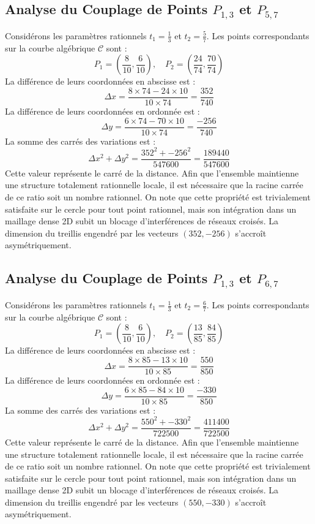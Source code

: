 \documentclass[12pt, a4paper]{article}
\begin{document}
\subsection{Analyse du Couplage de Points $P_{1,3}$ et $P_{5,7}$}
Considérons les paramètres rationnels $t_1 = \frac{1}{3}$ et $t_2 = \frac{5}{7}$.
Les points correspondants sur la courbe algébrique $\mathcal{C}$ sont :
$$ P_1 = \left( \frac{8}{10}, \frac{6}{10} \right), \quad P_2 = \left( \frac{24}{74}, \frac{70}{74} \right) $$
La différence de leurs coordonnées en abscisse est :
$$ \Delta x = \frac{8 \times 74 - 24 \times 10}{10 \times 74} = \frac{352}{740} $$
La différence de leurs coordonnées en ordonnée est :
$$ \Delta y = \frac{6 \times 74 - 70 \times 10}{10 \times 74} = \frac{-256}{740} $$
La somme des carrés des variations est :
$$ \Delta x^2 + \Delta y^2 = \frac{ 352^2 + -256^2 }{ 547600 } = \frac{ 189440 }{ 547600 } $$
Cette valeur représente le carré de la distance. Afin que l'ensemble maintienne une structure totalement rationnelle locale, il est nécessaire que la racine carrée de ce ratio soit un nombre rationnel. On note que cette propriété est trivialement satisfaite sur le cercle pour tout point rationnel, mais son intégration dans un maillage dense 2D subit un blocage d'interférences de réseaux croisés. La dimension du treillis engendré par les vecteurs $( 352, -256 )$ s'accroît asymétriquement.


\subsection{Analyse du Couplage de Points $P_{1,3}$ et $P_{6,7}$}
Considérons les paramètres rationnels $t_1 = \frac{1}{3}$ et $t_2 = \frac{6}{7}$.
Les points correspondants sur la courbe algébrique $\mathcal{C}$ sont :
$$ P_1 = \left( \frac{8}{10}, \frac{6}{10} \right), \quad P_2 = \left( \frac{13}{85}, \frac{84}{85} \right) $$
La différence de leurs coordonnées en abscisse est :
$$ \Delta x = \frac{8 \times 85 - 13 \times 10}{10 \times 85} = \frac{550}{850} $$
La différence de leurs coordonnées en ordonnée est :
$$ \Delta y = \frac{6 \times 85 - 84 \times 10}{10 \times 85} = \frac{-330}{850} $$
La somme des carrés des variations est :
$$ \Delta x^2 + \Delta y^2 = \frac{ 550^2 + -330^2 }{ 722500 } = \frac{ 411400 }{ 722500 } $$
Cette valeur représente le carré de la distance. Afin que l'ensemble maintienne une structure totalement rationnelle locale, il est nécessaire que la racine carrée de ce ratio soit un nombre rationnel. On note que cette propriété est trivialement satisfaite sur le cercle pour tout point rationnel, mais son intégration dans un maillage dense 2D subit un blocage d'interférences de réseaux croisés. La dimension du treillis engendré par les vecteurs $( 550, -330 )$ s'accroît asymétriquement.
\end{document}
